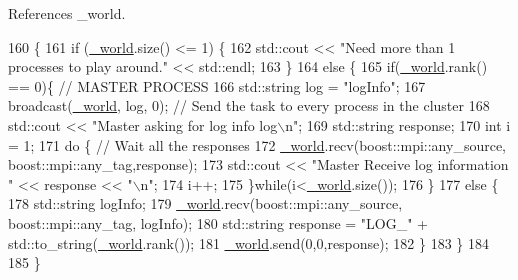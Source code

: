 References \+\_\+world.


\begin{DoxyCode}
160                                             \{
161     \textcolor{keywordflow}{if} (\hyperlink{classrdf_1_1DistributionManager_ac8a061176717baf96b2913cd22dcbf20}{\_world}.size() <= 1) \{
162     std::cout << \textcolor{stringliteral}{"Need more than 1 processes to play around."} << std::endl;
163     \}
164     \textcolor{keywordflow}{else} \{ 
165         \textcolor{keywordflow}{if}(\hyperlink{classrdf_1_1DistributionManager_ac8a061176717baf96b2913cd22dcbf20}{\_world}.rank() == 0)\{                                         \textcolor{comment}{// MASTER PROCESS}
166             std::string log = \textcolor{stringliteral}{"logInfo"};                               
167             broadcast(\hyperlink{classrdf_1_1DistributionManager_ac8a061176717baf96b2913cd22dcbf20}{\_world}, log, 0);                                  \textcolor{comment}{// Send the task to every
       process in the cluster}
168             std::cout << \textcolor{stringliteral}{"Master asking for log info log\(\backslash\)n"};
169             std::string response;
170             \textcolor{keywordtype}{int} i = 1;
171             \textcolor{keywordflow}{do} \{                                                        \textcolor{comment}{// Wait all the responses }
172                 \hyperlink{classrdf_1_1DistributionManager_ac8a061176717baf96b2913cd22dcbf20}{\_world}.recv(boost::mpi::any\_source, boost::mpi::any\_tag,response);
173                 std::cout << \textcolor{stringliteral}{"Master Receive log information "} << response  << \textcolor{stringliteral}{"\(\backslash\)n"};
174                 i++;
175             \}\textcolor{keywordflow}{while}(i<\hyperlink{classrdf_1_1DistributionManager_ac8a061176717baf96b2913cd22dcbf20}{\_world}.size()); 
176         \}    
177         \textcolor{keywordflow}{else} \{
178             std::string logInfo;
179             \hyperlink{classrdf_1_1DistributionManager_ac8a061176717baf96b2913cd22dcbf20}{\_world}.recv(boost::mpi::any\_source, boost::mpi::any\_tag, logInfo);
180             std::string response = \textcolor{stringliteral}{"LOG\_"} + std::to\_string(\hyperlink{classrdf_1_1DistributionManager_ac8a061176717baf96b2913cd22dcbf20}{\_world}.rank());
181             \hyperlink{classrdf_1_1DistributionManager_ac8a061176717baf96b2913cd22dcbf20}{\_world}.send(0,0,response);
182         \}
183     \}
184 
185 \}
\end{DoxyCode}
